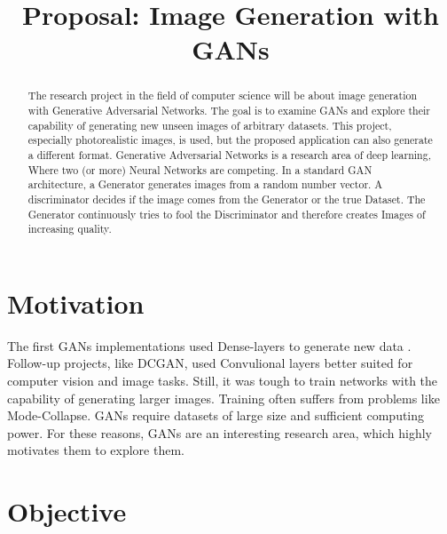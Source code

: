 \documentclass[conference,onecolumn,compsoc]{IEEEtran}
\begin{document}
\title{Proposal: Image Generation with GANs}

\author{
}
\maketitle

\begin{abstract}

\noindent
The research project in the field of computer science will be about image generation with Generative Adversarial
Networks. The goal is to examine GANs and explore their capability of generating new unseen images of arbitrary
datasets. This project, especially photorealistic images, is used, but the proposed application can also generate
a different format. Generative Adversarial Networks is a research area of deep learning, Where two (or more)
Neural Networks are competing. In a standard GAN architecture, a Generator generates images from a random number
vector. A discriminator decides if the image comes from the Generator or the true Dataset. The Generator continuously
tries to fool the Discriminator and therefore creates Images of increasing quality.

\end{abstract}


\section{Motivation}

\noindent
The first GANs implementations used Dense-layers to generate new data \cite{goodfellow2014generative}. Follow-up
projects, like DCGAN, \cite{radford2016unsupervised} used Convulional layers better suited for computer vision and
image tasks. Still, it was tough to train networks with the capability of generating larger images. Training often
suffers from problems like Mode-Collapse. GANs require datasets of large size and sufficient computing power. For
these reasons, GANs are an interesting research area, which highly motivates them to explore them.


\section{Objective}
\end{document}
